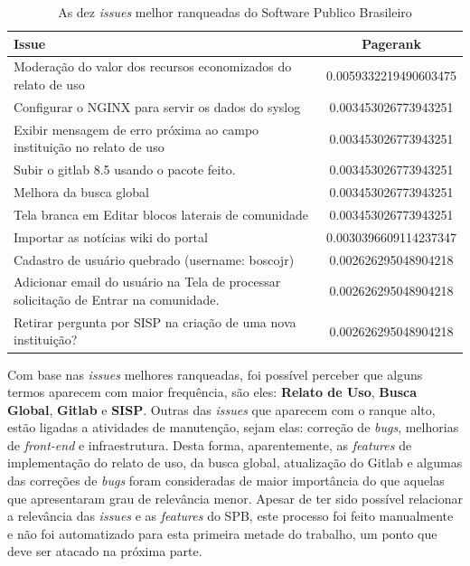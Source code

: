 \begin{table}[h]
        \centering
	\label{tab:pagerank}
	
        \begin{tabular}{| >{\centering}m{10cm} | c |}
        	\toprule
		\textbf{Issue} & \textbf{Pagerank} \\
		\midrule
		Moderação do valor dos recursos economizados do relato de uso & 0.0059332219490603475 \\ \hline
                Configurar o NGINX para servir os dados do syslog & 0.003453026773943251 \\ \hline
                Exibir mensagem de erro próxima ao campo instituição no relato de uso &  0.003453026773943251 \\\hline
                Subir o gitlab 8.5 usando o pacote feito. & 0.003453026773943251 \\\hline
                Melhora da busca global & 0.003453026773943251 \\\hline
                Tela branca em Editar blocos laterais de comunidade & 0.003453026773943251 \\\hline
                Importar as notícias wiki do portal &  0.0030396609114237347 \\\hline
                Cadastro de usuário quebrado (username: boscojr) & 0.002626295048904218 \\\hline
                Adicionar email do usuário na Tela de processar solicitação de Entrar na comunidade. & 0.002626295048904218 \\\hline
                Retirar pergunta por SISP na criação de uma nova instituição? & 0.002626295048904218 \\\hline
		\bottomrule      
 	\end{tabular}
        \caption{As dez \textit{issues} melhor ranqueadas do Software Publico Brasileiro}
\end{table}

Com base nas \textit{issues} melhores ranqueadas, foi possível perceber que alguns termos aparecem com maior frequência, são eles: \textbf{Relato de Uso}, \textbf{Busca Global}, \textbf{Gitlab} e \textbf{SISP}. Outras das \textit{issues} que aparecem com o ranque alto, estão ligadas a atividades de manutenção, sejam elas: correção de \textit{bugs}, melhorias de \textit{front-end} e infraestrutura. Desta forma, aparentemente, as \textit{features} de implementação do relato de uso, da busca global, atualização do Gitlab e algumas das correções de \textit{bugs} foram consideradas de maior importância do que aquelas que apresentaram grau de relevância menor. Apesar de ter sido possível relacionar a relevância das \textit{issues} e as \textit{features} do SPB, este processo foi feito manualmente e não foi automatizado para esta primeira metade do trabalho, um ponto que deve ser atacado na próxima parte.
